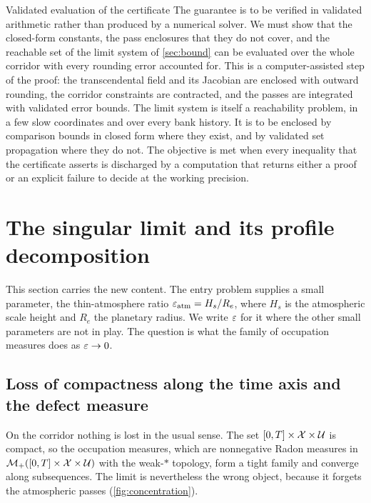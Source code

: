 \documentclass[english,11pt]{extarticle}
\begin{document}
\begin{openitem}{Validated evaluation of the certificate}
\label{obj:pipeline}
The guarantee is to be verified in validated arithmetic rather than produced
by a numerical solver. We must show that the closed-form constants, the pass
enclosures that they do not cover, and the reachable set of the limit system
of \cref{sec:bound} can be evaluated over the whole corridor with every
rounding error accounted for. This is a computer-assisted step of the proof:
the transcendental field and its Jacobian are enclosed with outward
rounding, the corridor constraints are contracted, and the passes are
integrated with validated error bounds. The limit system is itself a
reachability problem, in a few slow coordinates and over every bank history.
It is to be enclosed by comparison bounds in closed form where they exist,
and by validated set propagation where they do not. The objective is met
when every inequality that the certificate asserts is discharged by a
computation that returns either a proof or an explicit failure to decide at
the working precision.
\end{openitem}


\section{The singular limit and its profile decomposition}
\label{sec:profile}
This section carries the new content. The entry problem supplies a small
parameter, the thin-atmosphere ratio $\varepsilon_{\mathrm{atm}} = H_s/R_e$, where
$H_s$ is the atmospheric scale height and $R_e$ the planetary radius. We
write $\varepsilon$ for it where the other small parameters are not in play. The
question is what the family of occupation measures does as $\varepsilon\to 0$.

\subsection{Loss of compactness along the time axis and the defect measure}
\label{sec:loss}
On the corridor nothing is lost in the usual sense. The set
$[0,T]\times\mathcal{X}\times\mathcal{U}$ is compact, so the occupation measures, which
are nonnegative Radon measures in $\mathcal{M}_+([0,T]\times\mathcal{X}\times\mathcal{U})$ with
the weak-$*$ topology, form a tight family and converge along subsequences.
The limit is nevertheless the wrong object, because it forgets the
atmospheric passes (\cref{fig:concentration}).
\end{document}
